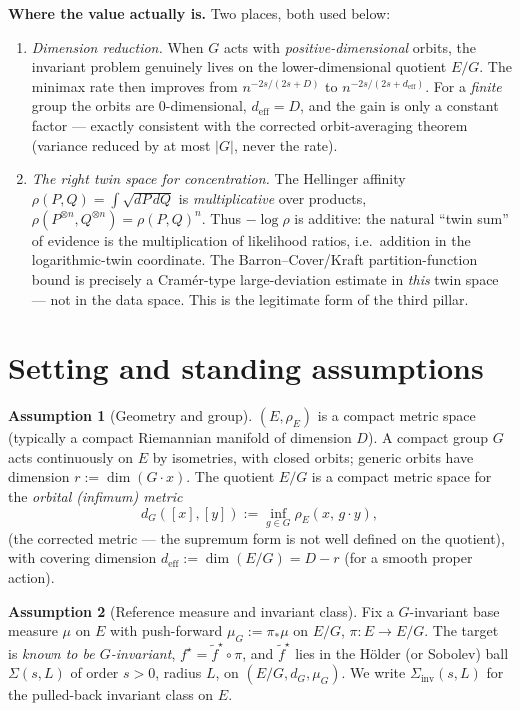 \documentclass[11pt]{article}
\theoremstyle{plain}
\theoremstyle{definition}
\newtheorem{assumption}{Assumption}
\theoremstyle{remark}
\DeclareMathOperator{\dimm}{dim}
\begin{document}
\medskip
\noindent\textbf{Where the value actually is.} Two places, both used below:
\begin{enumerate}[label=(\roman*)]
\item \emph{Dimension reduction.} When $G$ acts with \emph{positive-dimensional}
orbits, the invariant problem genuinely lives on the lower-dimensional quotient
$E/G$. The minimax rate then improves from $n^{-2s/(2s+D)}$ to
$n^{-2s/(2s+d_{\mathrm{eff}})}$. For a \emph{finite} group the orbits are
$0$-dimensional, $d_{\mathrm{eff}}=D$, and the gain is only a constant factor ---
exactly consistent with the corrected orbit-averaging theorem (variance reduced
by at most $|G|$, never the rate).
\item \emph{The right twin space for concentration.} The Hellinger affinity
$\rho(P,Q)=\int\sqrt{dP\,dQ}$ is \emph{multiplicative} over products,
$\rho(P^{\otimes n},Q^{\otimes n})=\rho(P,Q)^n$. Thus $-\log\rho$ is additive:
the natural ``twin sum'' of evidence is the multiplication of likelihood ratios,
i.e.\ addition in the logarithmic-twin coordinate. The Barron--Cover/Kraft
partition-function bound is precisely a Cram\'er-type large-deviation estimate in
\emph{this} twin space --- not in the data space. This is the legitimate form of
the third pillar.
\end{enumerate}

\section{Setting and standing assumptions}

\begin{assumption}[Geometry and group]\label{ass:geo}
$(E,\rho_E)$ is a compact metric space (typically a compact Riemannian manifold
of dimension $D$). A compact group $G$ acts continuously on $E$ by isometries,
with closed orbits; generic orbits have dimension $r:=\dimm(G\cdot x)$. The
quotient $E/G$ is a compact metric space for the \emph{orbital (infimum) metric}
\[
d_G([x],[y]) := \inf_{g\in G}\rho_E(x,\,g\cdot y),
\]
(the corrected metric --- the supremum form is not well defined on the quotient),
with covering dimension $d_{\mathrm{eff}}:=\dimm(E/G)=D-r$ (for a smooth proper
action).
\end{assumption}

\begin{assumption}[Reference measure and invariant class]\label{ass:class}
Fix a $G$-invariant base measure $\mu$ on $E$ with push-forward $\mu_G:=\pi_*\mu$
on $E/G$, $\pi:E\to E/G$. The target is \emph{known to be $G$-invariant},
$f^\star=\tilde f^\star\circ\pi$, and $\tilde f^\star$ lies in the H\"older (or
Sobolev) ball $\Sigma(s,L)$ of order $s>0$, radius $L$, on $(E/G,d_G,\mu_G)$. We
write $\Sigma_{\mathrm{inv}}(s,L)$ for the pulled-back invariant class on $E$.
\end{assumption}
\end{document}
